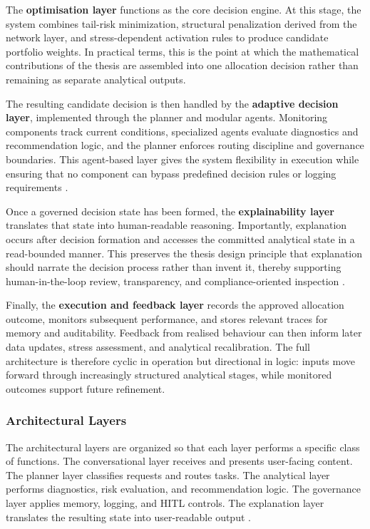 \documentclass[11pt]{article}
\begin{document}
The \textbf{optimisation layer} functions as the core decision engine. At this stage, the system combines tail-risk minimization, structural penalization derived from the network layer, and stress-dependent activation rules to produce candidate portfolio weights. In practical terms, this is the point at which the mathematical contributions of the thesis are assembled into one allocation decision rather than remaining as separate analytical outputs.

The resulting candidate decision is then handled by the \textbf{adaptive decision layer}, implemented through the planner and modular agents. Monitoring components track current conditions, specialized agents evaluate diagnostics and recommendation logic, and the planner enforces routing discipline and governance boundaries. This agent-based layer gives the system flexibility in execution while ensuring that no component can bypass predefined decision rules or logging requirements \cite{jennings1998,hayesroth1985,wooldridge2009}.

Once a governed decision state has been formed, the \textbf{explainability layer} translates that state into human-readable reasoning. Importantly, explanation occurs after decision formation and accesses the committed analytical state in a read-bounded manner. This preserves the thesis design principle that explanation should narrate the decision process rather than invent it, thereby supporting human-in-the-loop review, transparency, and compliance-oriented inspection \cite{adadi2018,arrieta2020,holzinger2016}.

Finally, the \textbf{execution and feedback layer} records the approved allocation outcome, monitors subsequent performance, and stores relevant traces for memory and auditability. Feedback from realised behaviour can then inform later data updates, stress assessment, and analytical recalibration. The full architecture is therefore cyclic in operation but directional in logic: inputs move forward through increasingly structured analytical stages, while monitored outcomes support future refinement.

\subsubsection{Architectural Layers}
The architectural layers are organized so that each layer performs a specific class of functions. The conversational layer receives and presents user-facing content. The planner layer classifies requests and routes tasks. The analytical layer performs diagnostics, risk evaluation, and recommendation logic. The governance layer applies memory, logging, and HITL controls. The explanation layer translates the resulting state into user-readable output \cite{wooldridge2009,wu2023,yu2023}.
\end{document}
